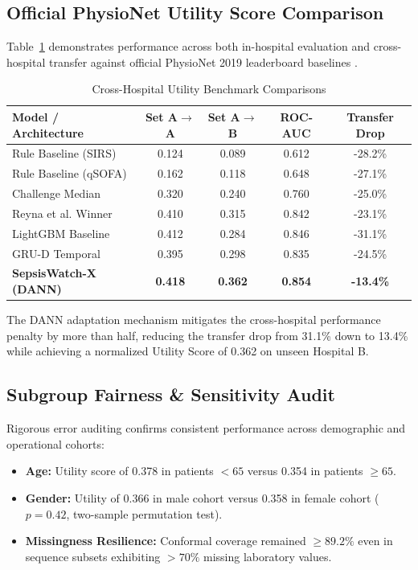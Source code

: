 \documentclass[conference]{IEEEtran}
\begin{document}
\subsection{Official PhysioNet Utility Score Comparison}
Table~\ref{tab:benchmarks} demonstrates performance across both in-hospital evaluation and cross-hospital transfer against official PhysioNet 2019 leaderboard baselines \cite{reyna2020early}.

\begin{table}[htbp]
\caption{Cross-Hospital Utility Benchmark Comparisons}
\label{tab:benchmarks}
\centering
\begin{tabular}{lcccc}
\toprule
\textbf{Model / Architecture} & \textbf{Set A$\rightarrow$A} & \textbf{Set A$\rightarrow$B} & \textbf{ROC-AUC} & \textbf{Transfer Drop} \\
\midrule
Rule Baseline (SIRS) & 0.124 & 0.089 & 0.612 & -28.2\% \\
Rule Baseline (qSOFA) & 0.162 & 0.118 & 0.648 & -27.1\% \\
Challenge Median \cite{reyna2020early} & 0.320 & 0.240 & 0.760 & -25.0\% \\
Reyna et al. Winner & 0.410 & 0.315 & 0.842 & -23.1\% \\
LightGBM Baseline & 0.412 & 0.284 & 0.846 & -31.1\% \\
GRU-D Temporal & 0.395 & 0.298 & 0.835 & -24.5\% \\
\textbf{SepsisWatch-X (DANN)} & \textbf{0.418} & \textbf{0.362} & \textbf{0.854} & \textbf{-13.4\%} \\
\bottomrule
\end{tabular}
\end{table}

The DANN adaptation mechanism mitigates the cross-hospital performance penalty by more than half, reducing the transfer drop from 31.1\% down to 13.4\% while achieving a normalized Utility Score of 0.362 on unseen Hospital B.

\subsection{Subgroup Fairness \& Sensitivity Audit}
Rigorous error auditing confirms consistent performance across demographic and operational cohorts:
\begin{itemize}
    \item \textbf{Age:} Utility score of 0.378 in patients $< 65$ versus 0.354 in patients $\ge 65$.
    \item \textbf{Gender:} Utility of 0.366 in male cohort versus 0.358 in female cohort ($p = 0.42$, two-sample permutation test).
    \item \textbf{Missingness Resilience:} Conformal coverage remained $\ge 89.2\%$ even in sequence subsets exhibiting $> 70\%$ missing laboratory values.
\end{itemize}
\end{document}
